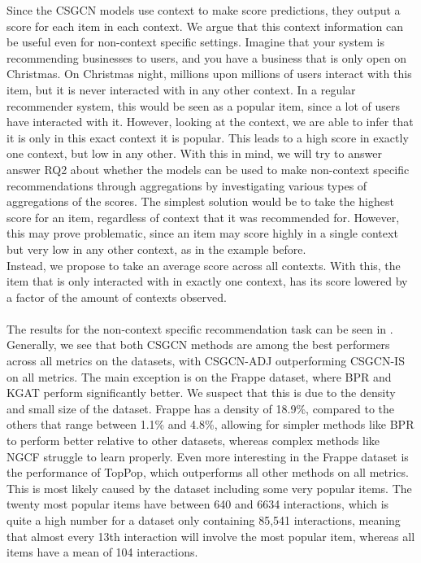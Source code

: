 Since the CSGCN models use context to make score predictions, they output a score for each item in each context.
We argue that this context information can be useful even for non-context specific settings.
Imagine that your system is recommending businesses to users, and you have a business that is only open on Christmas.
On Christmas night, millions upon millions of users interact with this item, but it is never interacted with in any other context.
In a regular recommender system, this would be seen as a popular item, since a lot of users have interacted with it.
However, looking at the context, we are able to infer that it is only in this exact context it is popular.
This leads to a high score in exactly one context, but low in any other.
With this in mind, we will try to answer answer RQ2 about whether the models can be used to make non-context specific recommendations through aggregations by investigating various types of aggregations of the scores.
The simplest solution would be to take the highest score for an item, regardless of context that it was recommended for.
However, this may prove problematic, since an item may score highly in a single context but very low in any other context, as in the example before.\\
Instead, we propose to take an average score across all contexts.
With this, the item that is only interacted with in exactly one context, has its score lowered by a factor of the amount of contexts observed.
\\\\
The results for the non-context specific recommendation task can be seen in .
Generally, we see that both CSGCN methods are among the best performers across all metrics on the datasets, with CSGCN-ADJ outperforming CSGCN-IS on all metrics.
The main exception is on the Frappe dataset, where BPR and KGAT perform significantly better.
We suspect that this is due to the density and small size of the dataset.
Frappe has a density of 18.9\%, compared to the others that range between 1.1\% and 4.8\%, allowing for simpler methods like BPR to perform better relative to other datasets, whereas complex methods like NGCF struggle to learn properly.
Even more interesting in the Frappe dataset is the performance of TopPop, which outperforms all other methods on all metrics.
This is most likely caused by the dataset including some very popular items.
The twenty most popular items have between 640 and 6634 interactions, which is quite a high number for a dataset only containing 85,541 interactions, meaning that almost every 13th interaction will involve the most popular item, whereas all items have a mean of 104 interactions.\\\\
